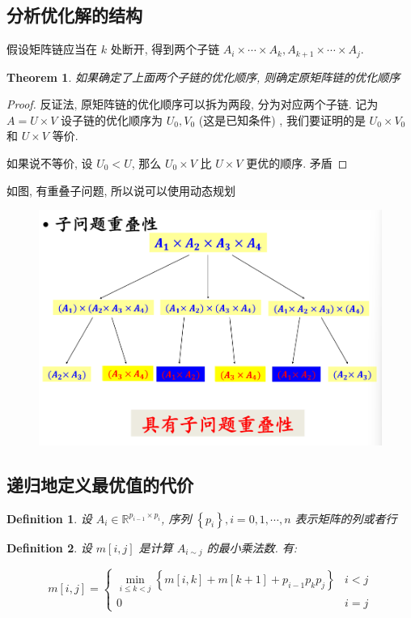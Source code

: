 \documentclass[a4paper, 10pt]{ctexart} %
\newtheorem{theorem}{Theorem}
\newtheorem{definition}{Definition}
\begin{document}
\subsection{分析优化解的结构}
假设矩阵链应当在 $k$ 处断开, 得到两个子链 $A_i \times \cdots  \times A_{k}, A_{k+1} \times \cdots  \times A_{j}$.
\begin{theorem}
    如果确定了上面两个子链的优化顺序, 则确定原矩阵链的优化顺序
\end{theorem}
\begin{proof}
    反证法, 原矩阵链的优化顺序可以拆为两段, 分为对应两个子链. 记为 $A =U \times V$\footnotemark
    设子链的优化顺序为 $U_{0} , V_0$ (这是已知条件) , 我们要证明的是 $U_0 \times V_0$ 和 $U \times V$ 等价\footnotemark.

    如果说不等价, 设 $U_0< U$, 那么 $U_0 \times V$ 比 $U \times V$ 更优的顺序. 矛盾
\end{proof}
如图, 有重叠子问题, 所以说可以使用动态规划
\begin{figure}[H]
    \centering
    \includegraphics[scale = 0.5]{6.png}
\end{figure}

\subsection{递归地定义最优值的代价}
\begin{definition}
设 $A_i \in \mathbb{R} ^{p_{i-1}\times p_{i}}$, 序列 $\left\{ p_{i}\right\}, i = 0, 1 , \cdots  , n$ 表示矩阵的列或者行\\ 
\end{definition}
\begin{definition}
设 $m [i, j ]$ 是计算 $A_{i \sim j}$ 的最小乘法数. 有:
\end{definition}
\[
    m\left[ i,j  \right]= 
    \begin{cases}
        \displaystyle \min_{i\le k <j} \left\{ m[i , k] + m [k+1 ] + p_{i-1} p_k p_j\right\} & i < j\\
        0 & i = j 
    \end{cases}
\]
\end{document}

